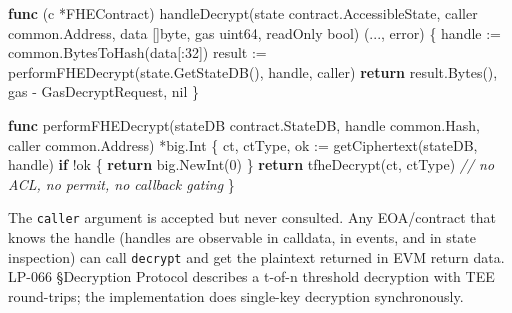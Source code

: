 \documentclass[
]{article}
\newenvironment{Shaded}{}{}
\newcommand{\CommentTok}[1]{\textcolor[rgb]{0.38,0.63,0.69}{\textit{#1}}}
\newcommand{\ControlFlowTok}[1]{\textcolor[rgb]{0.00,0.44,0.13}{\textbf{#1}}}
\newcommand{\DataTypeTok}[1]{\textcolor[rgb]{0.56,0.13,0.00}{#1}}
\newcommand{\DecValTok}[1]{\textcolor[rgb]{0.25,0.63,0.44}{#1}}
\newcommand{\KeywordTok}[1]{\textcolor[rgb]{0.00,0.44,0.13}{\textbf{#1}}}
\newcommand{\NormalTok}[1]{#1}
\newcommand{\OperatorTok}[1]{\textcolor[rgb]{0.40,0.40,0.40}{#1}}
\newcommand{\OtherTok}[1]{\textcolor[rgb]{0.00,0.44,0.13}{#1}}
\begin{document}
\begin{Shaded}
\begin{Highlighting}[]
\KeywordTok{func} \OperatorTok{(}\NormalTok{c }\OperatorTok{*}\NormalTok{FHEContract}\OperatorTok{)}\NormalTok{ handleDecrypt}\OperatorTok{(}\NormalTok{state contract}\OperatorTok{.}\NormalTok{AccessibleState}\OperatorTok{,}\NormalTok{ caller common}\OperatorTok{.}\NormalTok{Address}\OperatorTok{,}\NormalTok{ data }\OperatorTok{[]}\DataTypeTok{byte}\OperatorTok{,}\NormalTok{ gas }\DataTypeTok{uint64}\OperatorTok{,}\NormalTok{ readOnly }\DataTypeTok{bool}\OperatorTok{)} \OperatorTok{(...,} \DataTypeTok{error}\OperatorTok{)} \OperatorTok{\{}
\NormalTok{    handle }\OperatorTok{:=}\NormalTok{ common}\OperatorTok{.}\NormalTok{BytesToHash}\OperatorTok{(}\NormalTok{data}\OperatorTok{[:}\DecValTok{32}\OperatorTok{])}
\NormalTok{    result }\OperatorTok{:=}\NormalTok{ performFHEDecrypt}\OperatorTok{(}\NormalTok{state}\OperatorTok{.}\NormalTok{GetStateDB}\OperatorTok{(),}\NormalTok{ handle}\OperatorTok{,}\NormalTok{ caller}\OperatorTok{)}
    \ControlFlowTok{return}\NormalTok{ result}\OperatorTok{.}\NormalTok{Bytes}\OperatorTok{(),}\NormalTok{ gas }\OperatorTok{{-}}\NormalTok{ GasDecryptRequest}\OperatorTok{,} \OtherTok{nil}
\OperatorTok{\}}

\KeywordTok{func}\NormalTok{ performFHEDecrypt}\OperatorTok{(}\NormalTok{stateDB contract}\OperatorTok{.}\NormalTok{StateDB}\OperatorTok{,}\NormalTok{ handle common}\OperatorTok{.}\NormalTok{Hash}\OperatorTok{,}\NormalTok{ caller common}\OperatorTok{.}\NormalTok{Address}\OperatorTok{)} \OperatorTok{*}\NormalTok{big}\OperatorTok{.}\NormalTok{Int }\OperatorTok{\{}
\NormalTok{    ct}\OperatorTok{,}\NormalTok{ ctType}\OperatorTok{,}\NormalTok{ ok }\OperatorTok{:=}\NormalTok{ getCiphertext}\OperatorTok{(}\NormalTok{stateDB}\OperatorTok{,}\NormalTok{ handle}\OperatorTok{)}
    \ControlFlowTok{if} \OperatorTok{!}\NormalTok{ok }\OperatorTok{\{} \ControlFlowTok{return}\NormalTok{ big}\OperatorTok{.}\NormalTok{NewInt}\OperatorTok{(}\DecValTok{0}\OperatorTok{)} \OperatorTok{\}}
    \ControlFlowTok{return}\NormalTok{ tfheDecrypt}\OperatorTok{(}\NormalTok{ct}\OperatorTok{,}\NormalTok{ ctType}\OperatorTok{)}   \CommentTok{// no ACL, no permit, no callback gating}
\OperatorTok{\}}
\end{Highlighting}
\end{Shaded}

The \texttt{caller} argument is accepted but never consulted. Any
EOA/contract that knows the handle (handles are observable in calldata,
in events, and in state inspection) can call \texttt{decrypt} and get
the plaintext returned in EVM return data. LP-066 §Decryption Protocol
describes a t-of-n threshold decryption with TEE round-trips; the
implementation does single-key decryption synchronously.
\end{document}
